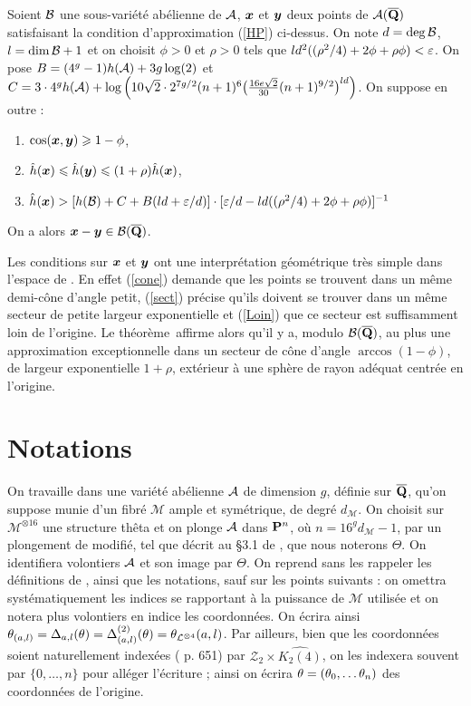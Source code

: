 \documentclass{mpg-preth}
\begin{document}
\begin{thm} \label{Mumford}
 Soient $\mathcal B$ une sous-variété abélienne de $\mathcal A$, $\boldsymbol{x}$ et $\boldsymbol{y}$ deux points
 de $\mathcal A(\overline{\mathbf{Q}})$ satisfaisant la condition d'approximation (\ref{HP})
 ci-dessus. On note $d = \deg \mathcal B$, $l = \dim\mathcal B + 1$ et on choisit $\phi > 0$
 et $\rho > 0$ tels que $ld^2((\rho^2/4) + 2\phi + \rho\phi)< \varepsilon$. On pose
 $B = (4^g-1)h(\mathcal A) + 3g\log(2)$ et $C = 3\cdot4^gh(\mathcal A) + \log\Big(
 10\sqrt2\cdot 2^{7g/2} (n+1)^6\big(\frac{16e\sqrt
   2}{30}(n+1)^{9/2}\big)^{ld}\Big)$. On suppose en outre :
 \begin{enumerate}
  \item $\cos(\boldsymbol{x},\boldsymbol{y}) \geqslant 1-\phi$, \label{cone}
  \item $\smash{\hat h}(\boldsymbol{x}) \leqslant \smash{\hat h}(\boldsymbol{y}) \leqslant (1+\rho)\smash{\hat h}(\boldsymbol{x})$, \label{sect}
  \item $\smash{\hat h}(\boldsymbol{x}) > [h(\mathcal B) + C + B(ld + \varepsilon/d)] \cdot [\varepsilon/d -
  ld((\rho^2/4) + 2\phi + \rho\phi)]^{-1}$\label{Loin}
  \end{enumerate}
 On a alors $\boldsymbol{x} - \boldsymbol{y} \in \mathcal B(\overline{\mathbf{Q}})$.
\end{thm}

Les conditions sur $\boldsymbol{x}$ et $\boldsymbol{y}$ ont une interprétation géométrique très
simple dans l'espace de . En effet (\ref{cone}) demande que
les points se trouvent dans un même demi-cône d'angle petit, (\ref{sect})
précise qu'ils doivent se trouver dans un même secteur de petite largeur
exponentielle et (\ref{Loin}) que ce secteur est suffisamment loin de
l'origine. Le théorème~affirme alors qu'il y a, modulo $\mathcal B(\overline{\mathbf{Q}})$, au plus
une approximation exceptionnelle dans un secteur de cône d'angle
$\arccos(1-\phi)$, de largeur exponentielle $1+\rho$, extérieur à une sphère
de rayon adéquat centrée en l'origine.

  \section{Notations}

On travaille dans une variété abélienne $\mathcal A$ de dimension $g$, définie sur
$\overline{\mathbf{Q}}$, qu'on suppose munie d'un fibré $\mathcal{M}$ ample et symétrique, de
degré $d_\mathcal{M}$. On choisit sur $\mathcal{M}^{\otimes 16}$ une structure
thêta et on plonge $\mathcal A$ dans $\mathbf{P}^n$, où $n=16^g d_\mathcal{M} - 1$, par un
plongement de  modifié, tel que décrit au §3.1 de
\cite{daphiminvaii}, que nous noterons $\Theta$. On identifiera volontiers
$\mathcal A$ et son image par $\Theta$. On reprend sans les rappeler les définitions
de , ainsi que les notations, sauf sur les points suivants : on
omettra systématiquement les indices se rapportant à la puissance de
$\mathcal{M}$ utilisée et on notera plus volontiers en indice les coordonnées.
On écrira ainsi $\theta_{(a, l)} = \Delta_{a, l}(\theta)  = \Delta_{(a,
  l)}^{(2)}(\theta) = \theta_{\mathcal{L}^{\otimes 4}}(a, l)$. Par ailleurs, bien
que les coordonnées soient naturellement indexées ( p. 651) par
$\mathcal{Z}_2 \times \widehat{K_2(4)}$, on les indexera souvent par $\{0,
  \dots, n\}$ pour alléger l'écriture  ; ainsi on écrira $\theta = (\theta_0,
\dots \theta_n)$ des coordonnées de l'origine.
\end{document}
